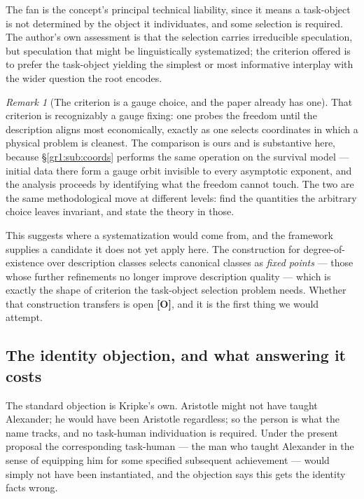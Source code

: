\documentclass[11pt]{article}
\numberwithin{equation}{section}
\theoremstyle{plain}
\theoremstyle{definition}
\theoremstyle{remark}
\newtheorem{remark}[theorem]{Remark}
\begin{document}
The fan is the concept's principal technical liability, since it means a
task-object is not determined by the object it individuates, and some
selection is required. The author's own assessment is that the
selection carries irreducible speculation, but speculation that might be
linguistically systematized; the criterion offered is to prefer the
task-object yielding the simplest or most informative interplay with the
wider question the root encodes.

\begin{remark}[The criterion is a gauge choice, and the paper already
has one]\label{to:rem:gauge}
That criterion is recognizably a gauge fixing: one probes the freedom
until the description aligns most economically, exactly as one selects
coordinates in which a physical problem is cleanest. The comparison is
ours and is substantive here, because
\S\ref{gr1:sub:coords} performs the same operation on the survival
model --- initial data there form a gauge orbit invisible to every
asymptotic exponent, and the analysis proceeds by identifying what the
freedom cannot touch. The two are the same methodological move at
different levels: find the quantities the arbitrary choice leaves
invariant, and state the theory in those.

This suggests where a systematization would come from, and the framework
supplies a candidate it does not yet apply here. The construction for
degree-of-existence over description classes \cite{Aethus} selects
canonical classes as \emph{fixed points} --- those whose further
refinements no longer improve description quality --- which is exactly
the shape of criterion the task-object selection problem needs. Whether
that construction transfers is open \textbf{[O]}, and it is the first
thing we would attempt.
\end{remark}

\subsection{The identity objection, and what answering it costs}
\label{to:sub:identity}

The standard objection is Kripke's own. Aristotle might not have taught
Alexander; he would have been Aristotle regardless; so the person is
what the name tracks, and no task-human individuation is required.
Under the present proposal the corresponding task-human --- the man who
taught Alexander in the sense of equipping him for some specified
subsequent achievement --- would simply not have been instantiated, and
the objection says this gets the identity facts wrong.
\end{document}

